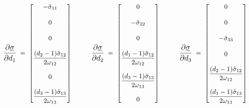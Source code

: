 \documentclass[12pt,a4paper,twoside,openright]{report}
\begin{document}
$$
\mathlarger{\frac{\partial \underline{\sigma}}{\partial d_{1}}}  \; = \; 
\begin{bmatrix}
 \mathlarger{-\tilde{\sigma}_{11}}\\
 \\
  \mathlarger{0}\\
  \\
  \mathlarger{0}\\
  \\
 \mathlarger{\frac{(d_{2}-1)\tilde{\sigma}_{12}}{2\omega_{12}}} \\
 \\
 \mathlarger{0}\\
 \\
 \mathlarger{\frac{(d_{3}-1)\tilde{\sigma}_{13}}{2\omega_{13}}} 
 \end{bmatrix}
 \hspace*{1cm}
 \mathlarger{\frac{\partial \underline{\sigma}}{\partial d_{2}}}  \; = \; 
\begin{bmatrix}
  \mathlarger{0}\\
  \\
  \mathlarger{-\tilde{\sigma}_{22}}\\
 \\
  \mathlarger{0}\\
  \\
 \mathlarger{\frac{(d_{1}-1)\tilde{\sigma}_{12}}{2\omega_{12}}} \\
 \\
 \mathlarger{\frac{(d_{3}-1)\tilde{\sigma}_{13}}{2\omega_{13}}}\\ 
 \\
 \mathlarger{0}
 \end{bmatrix}
 \hspace*{1cm}
 \mathlarger{\frac{\partial \underline{\sigma}}{\partial d_{3}}}  \; = \; 
\begin{bmatrix}
  \mathlarger{0}\\
  \\
  \mathlarger{0}\\
  \\
  \mathlarger{-\tilde{\sigma}_{33}}\\
  \\
 \mathlarger{0}\\
 \\
 \mathlarger{\frac{(d_{2}-1)\tilde{\sigma}_{12}}{2\omega_{12}}} \\
 \\
 \mathlarger{\frac{(d_{1}-1)\tilde{\sigma}_{13}}{2\omega_{13}}} 
 \end{bmatrix}
$$
\vspace*{1cm}
\end{document}
